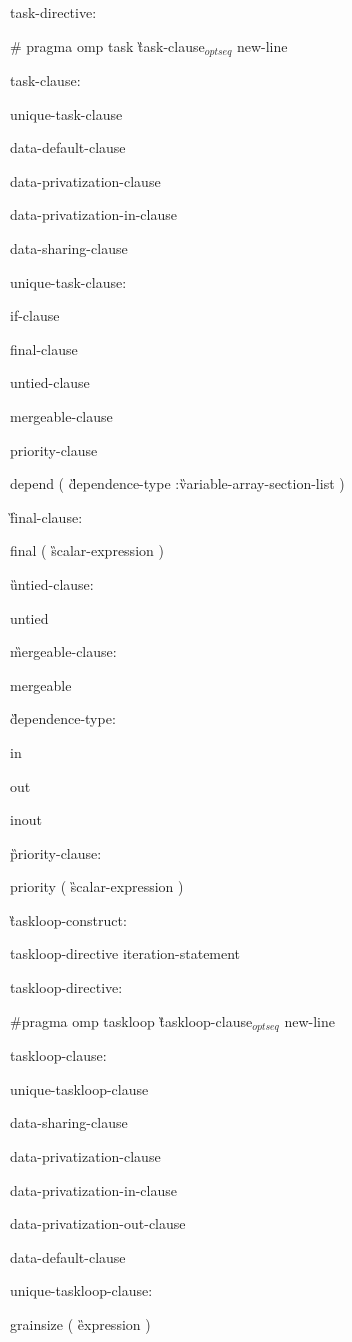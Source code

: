 {\I task-directive:

\C\I\I \# pragma omp task \G task-clause$_{optseq}$ new-line

task-clause:

\I unique-task-clause

\I data-default-clause

\I data-privatization-clause

\I data-privatization-in-clause

\I data-sharing-clause

unique-task-clause:

\I if-clause

\I final-clause

\I untied-clause

\I mergeable-clause 

\I priority-clause

\C\I depend ( \G dependence-type \C :\G variable-array-section-list \C )

\G final-clause:

\C\I final ( \G scalar-expression \C )

\G untied-clause:

\C\I untied

\G mergeable-clause:

\C\I mergeable

\G dependence-type:

\C\I in

\I out

\I inout

\G priority-clause:

\C\I priority ( \G scalar-expression \C )

\G taskloop-construct:

\I taskloop-directive iteration-statement

taskloop-directive:

\C\I \#pragma omp taskloop \G taskloop-clause$_{optseq}$ new-line

taskloop-clause:

\I unique-taskloop-clause 

\I data-sharing-clause

\I data-privatization-clause

\I data-privatization-in-clause

\I data-privatization-out-clause

\I data-default-clause

unique-taskloop-clause:

\C\I grainsize ( \G expression \C )

}
